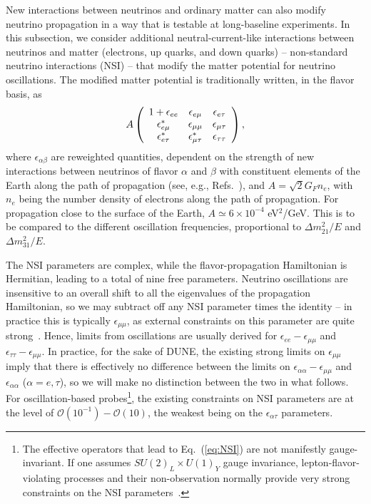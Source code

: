 \documentclass[aps,prd,onecolumn,nofootinbib,superscriptaddress, 11pt]{revtex4}
\begin{document}
New interactions between neutrinos and ordinary matter can also modify neutrino propagation in a way that is testable at long-baseline experiments. In this subsection, we consider additional neutral-current-like interactions between neutrinos and matter (electrons, up quarks, and down quarks) -- non-standard neutrino interactions (NSI) -- that modify the matter potential for neutrino oscillations. The modified matter potential is traditionally written, in the flavor basis, as
\begin{equation}\label{eq:NSI}
 A\left(\begin{array}{c c c} 1+\epsilon_{ee} & \epsilon_{e\mu} & \epsilon_{e\tau} \\ \epsilon_{e\mu}^* & \epsilon_{\mu\mu} & \epsilon_{\mu\tau} \\ \epsilon_{e\tau}^* & \epsilon_{\mu\tau}^* & \epsilon_{\tau\tau}\end{array}\right),
\end{equation}
where $\epsilon_{\alpha\beta}$ are reweighted quantities, dependent on the strength of new interactions between neutrinos of flavor $\alpha$ and $\beta$ with constituent elements of the Earth along the path of propagation (see, e.g., Refs.~\cite{Friedland:2004pp,Friedland:2004ah,Friedland:2005vy,Yasuda:2010hw,GonzalezGarcia:2011my,Choubey:2014iia,Friedland:2006pi,Ohlsson:2012kf,Kikuchi:2008vq,deGouvea:2015ndi,Farzan:2017xzy}), and $A = \sqrt{2} G_F n_e$, with $n_e$ being the number density of electrons along the path of propagation. For propagation close to the surface of the Earth, $A \simeq 6\times 10^{-4}$ eV$^2$/GeV. This is to be compared to the different oscillation frequencies, proportional to $\Delta m_{21}^2/E$ and $\Delta m_{31}^2/E$.

The NSI parameters are complex, while the flavor-propagation Hamiltonian is Hermitian, leading to a total of nine free parameters. Neutrino oscillations are insensitive to an overall shift to all the eigenvalues of the propagation Hamiltonian, so we may subtract off any NSI parameter times the identity -- in practice this is typically $\epsilon_{\mu\mu}$, as external constraints on this parameter are quite strong~\cite{Ohlsson:2012kf}. Hence, limits from oscillations are usually derived for $\epsilon_{ee} - \epsilon_{\mu\mu}$ and $\epsilon_{\tau\tau} - \epsilon_{\mu\mu}$. In practice, for the sake of DUNE, the existing strong limits on $\epsilon_{\mu\mu}$ imply that there is effectively no difference between the limits on $\epsilon_{\alpha\alpha} - \epsilon_{\mu\mu}$ and $\epsilon_{\alpha\alpha}$ ($\alpha=e,\tau$), so we will make no distinction between the two in what follows. For oscillation-based probes\footnote{The effective operators that lead to Eq.~(\ref{eq:NSI}) are not manifestly gauge-invariant. If one assumes $SU(2)_L\times U(1)_Y$ gauge invariance, lepton-flavor-violating processes and their non-observation normally provide very strong constraints on the NSI parameters~\cite{Davidson:2003ha,Abdallah:2003np,Ribeiro:2007ud}.}, the existing constraints on NSI parameters are at the level of $\mathcal{O}(10^{-1})-\mathcal{O}(10)$, the weakest being on the $\epsilon_{\alpha\tau}$ parameters. 
\end{document}

